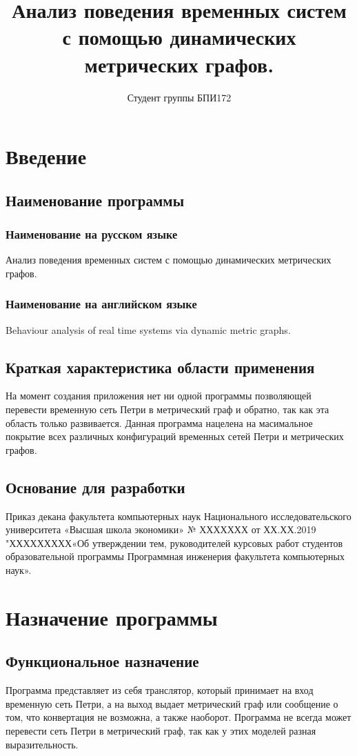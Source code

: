 \documentclass{../TechDoc}
\title{Анализ поведения временных систем с помощью динамических метрических графов.}
\author{Студент группы БПИ172}{А. А. Измайлов}
\begin{document}
	\maketitle
	\tableofcontents
	
	\section{Введение}
	\subsection{Наименование программы}
	\subsubsection{Наименование на русском языке}
	Анализ поведения временных систем с помощью динамических метрических графов.
	\subsubsection{Наименование на английском языке}
	Behaviour analysis of real time systems via dynamic metric graphs.
	\subsection{Краткая характеристика области применения}
	На момент создания приложения нет ни одной программы позволяющей перевести временную сеть Петри в метрический граф и обратно, так как эта область только развивается. Данная программа нацелена на масимальное покрытие всех различных конфигураций временных сетей Петри и метрических графов.
	\subsection{Основание для разработки}
	Приказ декана факультета компьютерных наук Национального исследовательского университета «Высшая школа экономики» № ХХХХХХХ от ХХ.ХХ.2019 "ХХХХХХХХХ«Об утверждении тем, руководителей курсовых работ студентов образовательной программы Программная инженерия факультета компьютерных наук».
	
	\section{Назначение программы}
	\subsection{Функциональное назначение}
	Программа представляет из себя транслятор, который принимает на вход временную сеть Петри\cite{PetriNet}, а на выход выдает метрический граф\cite{MGraphs} или сообщение о том, что конвертация не возможна, а также наоборот. Программа не всегда может перевести сеть Петри в метрический граф, так как у этих моделей разная выразительность.
\end{document}
